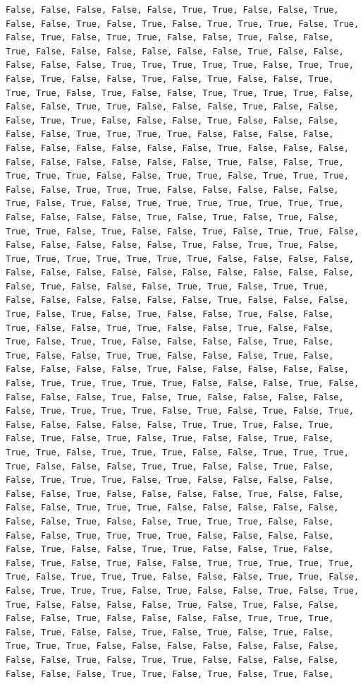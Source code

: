 \documentclass[
  letterpaper,
  DIV=11,
  numbers=noendperiod]{scrartcl}
\begin{document}
\begin{verbatim}
False, False, False, False, False, True, True, False, False, True, False, False, True, False, True, False, True, True, True, False, True, False, True, False, True, True, False, False, True, False, False, True, False, False, False, False, False, False, True, False, False, False, False, False, True, True, True, True, True, False, True, True, False, True, False, False, True, False, True, False, False, True, True, True, False, True, False, False, True, True, True, True, False, False, False, True, True, False, False, False, True, False, False, False, True, True, False, False, False, True, False, False, False, False, False, True, True, True, True, False, False, False, False, False, False, False, False, False, False, True, False, False, False, False, False, False, False, False, False, True, False, False, True, True, True, True, False, False, True, True, False, True, True, True, False, False, True, True, True, False, False, False, False, False, True, False, True, False, True, True, True, True, True, True, True, False, False, False, False, True, False, True, False, True, False, True, True, False, True, False, False, True, False, True, True, False, False, False, False, False, False, True, False, True, True, False, True, True, True, True, True, True, True, False, False, False, False, False, False, False, False, False, False, False, False, False, False, False, True, False, False, False, True, True, False, True, True, False, False, False, False, False, False, True, False, False, False, True, False, True, False, True, False, False, True, False, False, True, False, False, True, True, False, False, True, False, False, True, False, True, True, False, False, False, False, True, False, True, False, False, True, True, False, False, False, True, False, False, False, False, False, True, False, False, False, False, False, False, True, True, True, True, True, False, False, False, True, False, False, False, False, True, False, True, False, False, False, False, False, True, True, True, True, False, True, False, True, False, True, False, False, False, False, False, True, True, True, False, True, False, True, False, True, False, True, False, False, True, False, True, True, False, True, True, True, False, False, True, True, True, True, False, False, False, True, True, False, False, True, False, False, True, True, True, False, True, False, False, False, False, False, False, True, False, False, False, False, True, False, False, False, False, True, True, True, False, False, False, False, False, False, False, True, False, False, True, True, True, False, False, False, False, True, True, True, True, False, False, False, False, False, True, False, False, True, True, False, False, True, False, False, True, False, True, False, False, True, True, True, True, True, True, False, True, True, True, False, False, False, True, True, False, False, True, True, True, False, True, False, False, True, False, True, True, False, False, False, False, True, False, True, False, False, False, False, True, False, False, False, False, True, True, True, False, True, False, False, True, False, True, False, True, False, True, True, True, False, False, False, False, False, False, False, False, False, True, False, True, True, False, False, False, False, False, False, False, True, True, False, True, False, True, False, 
\end{verbatim}
\end{document}

